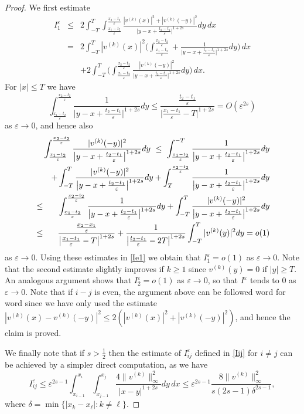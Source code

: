 \documentclass{article}
\newcommand{\e}{\varepsilon}
\begin{document}
\begin{proof}
We first estimate
\begin{eqnarray}\label{Ie1}\nonumber
I^\e_1&\le& 2\int_{-T}^{T}\int_{\frac{x_1-t_2}\e}^{\frac{x_2-t_2}\e} \frac{|v^{(k)}(x)|^2+
|v^{(k)}(-y)|^2}{\big|y-x+\frac{t_2-t_1}\e \big|^{1+2s}}dy\,dx
\\ \nonumber
&= &2\int_{-T}^{T}|v^{(k)}(x)|^2\Big(\int_{\frac{x_1-t_2}\e}^{\frac{x_2-t_2}\e} +
\frac1{\big|y-x+\frac{t_2-t_1}\e \big|^{1+2s}}dy\Big)\,dx
\\
&&+2\int_{-T}^{T}\Big(\int_{\frac{x_1-t_2}\e}^{\frac{x_2-t_2}\e} \frac{
|v^{(k)}(-y)|^2}{\big|y-x+\frac{t_2-t_1}\e \big|^{1+2s}}dy\Big)\,dx.
\end{eqnarray}
For $|x|\le T$ we have
$$
\int_{\frac{x_1-t_2}\e}^{\frac{x_2-t_2}\e} \frac{
1}{\big|y-x+\frac{t_2-t_1}\e \big|^{1+2s}}dy
\le\frac{\frac{t_2-t_1}\e}{\big|\frac{x_1-t_1}\e-T \big|^{1+2s}} =O(\e^{2s})
$$
as $\e\to 0$, and hence also
\begin{eqnarray*}
&&\hskip-1.5cm\int_{\frac{x_1-t_2}\e}^{\frac{x_2-t_2}\e} \frac{
|v^{(k)}(-y)|^2}{\big|y-x+\frac{t_2-t_1}\e \big|^{1+2s}}dy\ 
\le\ \int_{\frac{x_1-t_2}\e}^{-T} \frac{
1}{\big|y-x+\frac{t_2-t_1}\e \big|^{1+2s}}dy
\\
&&+\int_{-T}^{T} \frac{
|v^{(k)}(-y)|^2}{\big|y-x+\frac{t_2-t_1}\e \big|^{1+2s}}dy
+
\int_{T}^{\frac{x_2-t_2}\e} \frac{1}{\big|y-x+\frac{t_2-t_1}\e \big|^{1+2s}}dy
\\
&\le&
\int_{\frac{x_1-t_2}\e}^{\frac{x_2-t_2}\e} \frac{
1}{\big|y-x+\frac{t_2-t_1}\e \big|^{1+2s}}dy
+\int_{-T}^{T} \frac{
|v^{(k)}(-y)|^2}{\big|y-x+\frac{t_2-t_1}\e \big|^{1+2s}}dy
\\
&\le& \frac{\frac{x_2-x_1}\e}{\big|\frac{x_1-t_1}\e-T \big|^{1+2s}}+\frac1{\big|\frac{t_2-t_1}\e-2T \big|^{1+2s}}\int_{-T}^{T} 
|v^{(k)}(y)|^2dy=o(1)
\end{eqnarray*}
as $\e\to 0$. Using these estimates in \eqref{Ie1} we obtain that $I^\e_1=o(1)$ as $\e\to 0$. Note that the second estimate slightly improves if $k\ge 1$ since $v^{(k)}(y)=0$ if $|y|\ge T$. An analogous argument shows that $I^\e_2=o(1)$ as $\e\to 0$,
so that $I^\e$ tends to $0$ as $\e\to 0$. Note that if $i-j$ is even, the argument above can be followed word for word since we have only used the estimate $|v^{(k)}(x)-v^{(k)}(-y)|^2\le 2(|v^{(k)}(x)|^2+|v^{(k)}(-y)|^2)$, and hence the claim is proved.

We finally note that if $s>\frac12$ then the estimate of $I^\e_{ij}$ defined in \eqref{Iij}  for $i\neq j$ can be achieved by a simpler direct computation, as we have
$$
I^\e_{ij}\le\e^{2s-1} \int_{x_{i-1}}^{x_i}\int_{x_{j-1}}^{x_j}\frac{4\|v^{(k)}\|_\infty^2}{|x-y|^{1+2s}}dy\,dx\le \e^{2s-1}\frac{8\|v^{(k)}\|_\infty^2}{s(2s-1){\delta^{2s-1}}},
$$
where $\delta=\min\{|x_k-x_\ell|: k\neq \ell\}$.
\end{proof} 
\end{document}
